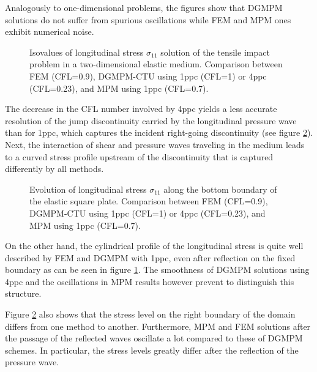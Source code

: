Analogously to one-dimensional problems, the figures show that DGMPM solutions do not suffer from spurious oscillations while FEM and MPM ones exhibit numerical noise.
\begin{figure}[h!]
  \centering
  
  \caption{Isovalues of longitudinal stress $\sigma_{11}$ solution of the tensile impact problem in a two-dimensional elastic medium. Comparison between FEM (CFL=0.9), DGMPM-CTU using 1ppc (CFL=1) or 4ppc (CFL=0.23), and MPM using 1ppc (CFL=0.7).}
  \label{fig:2delast_comparison}
\end{figure}
The decrease in the CFL number involved by 4ppc yields a less accurate resolution of the jump discontinuity carried by the longitudinal pressure wave than for 1ppc, which captures the incident right-going discontinuity (see figure \ref{fig:elastlines}).
Next, the interaction of shear and pressure waves traveling in the medium leads to a curved stress profile upstream of the discontinuity that is captured differently by all methods.  
\begin{figure}[h!]
  { \label{subfig:line_elast1}}
  { \label{subfig:line_elast2}}
  
  \caption{Evolution of longitudinal stress $\sigma_{11}$ along the bottom boundary of the elastic square plate. Comparison between FEM (CFL=0.9), DGMPM-CTU using 1ppc (CFL=1) or 4ppc (CFL=0.23), and MPM using 1ppc (CFL=0.7).}
  \label{fig:elastlines}
\end{figure}
On the other hand, the cylindrical profile of the longitudinal stress is quite well described by FEM and DGMPM with 1ppc, even after reflection on the fixed boundary as can be seen in figure \ref{fig:2delast_comparison}. The smoothness of DGMPM solutions using 4ppc and the oscillations in MPM results however prevent to distinguish this structure.

Figure \ref{fig:elastlines} also shows that the stress level on the right boundary of the domain differs from one method to another. Furthermore, MPM and FEM solutions after the passage of the reflected waves oscillate a lot compared to these of DGMPM schemes. In particular, the stress levels greatly differ after the reflection of the pressure wave.


